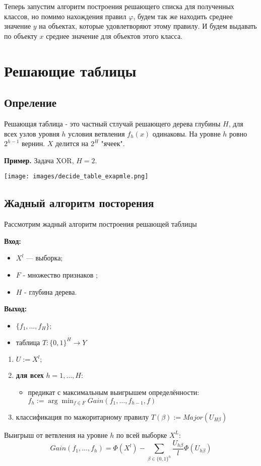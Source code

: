 Теперь запустим алгоритм построения решающего списка для полученных классов, 
но помимо нахождения правил $\varphi$, будем так же находить среднее значение $y$ на объектах, которые удовлетворяют этому правилу.
И будем выдавать по объекту $x$ среднее значение для объектов этого класса.

\section {Решающие таблицы}
\subsection{Опреление}

Решающая таблица - это частный стлучай решающего дерева глубины $H$, для всех узлов уровня $h$ условия ветвления $f_h(x)$ одинаковы. На уровне $h$ ровно $2^{h-1}$ вернин. $X$ делится на $2^H$ "ячеек".

\textbf{Пример.} Задача XOR, $H = 2$.

    \texttt{[image: images/decide\_table\_exapmle.png]}

\subsection{Жадный алгоритм посторения}
Рассмотрим жадный алгоритм построения решающей таблицы

\hline
\textbf{Вход:}
\begin{itemize}
    \item $X^l$ — выборка;
    \item $F$ - множество признаков ;
    \item $H$ - глубина дерева.
\end{itemize}

\textbf{Выход:}
\begin{itemize}
    \item $\{f_1, \dots, f_H\};$ 
    \item таблица $T: \{0, 1\}^H \xrightarrow{} Y$
\end{itemize}

\hline
\begin{enumerate}
    \item $U := X^l;$
    \item \textbf{для всех} $h = 1, \dots, H$:
    \begin{itemize}
        \item предикат с максимальным выигрышем определённости:
        $f_h := \arg\min_{f \in F} Gain(f_1, \dots, f_{h-1}, f)$
    \end{itemize}
    \item классификация по мажоритарному правилу 
    $ T(\beta) := Major(U_{H\beta}) $
\end{enumerate}
\hline
Выигрыш от ветвления на уровне $h$ по всей выборке $X^L$:
$$Gain(f_1, \dots, f_h) = \Phi(X^l) - \sum_{\beta\in \{0, 1\}^h} \frac{U_{h\beta}}{l}\Phi(U_{h\beta})$$


